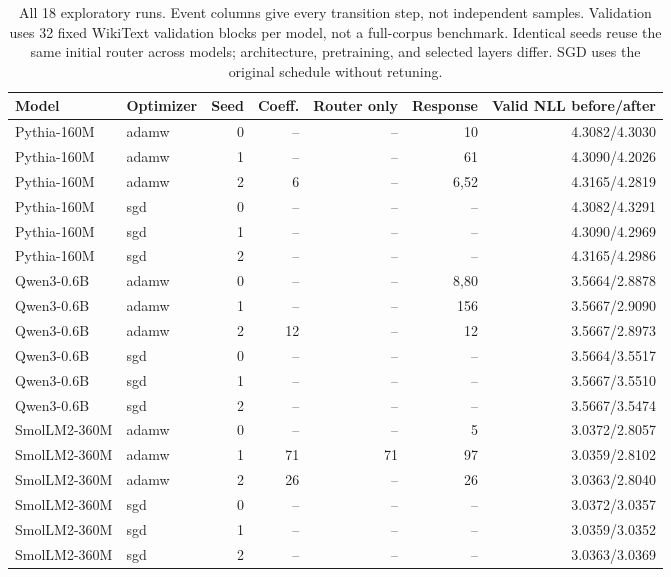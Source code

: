 \begin{table}[htbp]
\centering\small
\begin{tabular}{llrrrrr}
\toprule
Model & Optimizer & Seed & Coeff. & Router only & Response & Valid NLL before/after \\
\midrule
Pythia-160M & adamw & 0 & -- & -- & 10 & 4.3082/4.3030 \\
Pythia-160M & adamw & 1 & -- & -- & 61 & 4.3090/4.2026 \\
Pythia-160M & adamw & 2 & 6 & -- & 6,52 & 4.3165/4.2819 \\
Pythia-160M & sgd & 0 & -- & -- & -- & 4.3082/4.3291 \\
Pythia-160M & sgd & 1 & -- & -- & -- & 4.3090/4.2969 \\
Pythia-160M & sgd & 2 & -- & -- & -- & 4.3165/4.2986 \\
Qwen3-0.6B & adamw & 0 & -- & -- & 8,80 & 3.5664/2.8878 \\
Qwen3-0.6B & adamw & 1 & -- & -- & 156 & 3.5667/2.9090 \\
Qwen3-0.6B & adamw & 2 & 12 & -- & 12 & 3.5667/2.8973 \\
Qwen3-0.6B & sgd & 0 & -- & -- & -- & 3.5664/3.5517 \\
Qwen3-0.6B & sgd & 1 & -- & -- & -- & 3.5667/3.5510 \\
Qwen3-0.6B & sgd & 2 & -- & -- & -- & 3.5667/3.5474 \\
SmolLM2-360M & adamw & 0 & -- & -- & 5 & 3.0372/2.8057 \\
SmolLM2-360M & adamw & 1 & 71 & 71 & 97 & 3.0359/2.8102 \\
SmolLM2-360M & adamw & 2 & 26 & -- & 26 & 3.0363/2.8040 \\
SmolLM2-360M & sgd & 0 & -- & -- & -- & 3.0372/3.0357 \\
SmolLM2-360M & sgd & 1 & -- & -- & -- & 3.0359/3.0352 \\
SmolLM2-360M & sgd & 2 & -- & -- & -- & 3.0363/3.0369 \\
\bottomrule\end{tabular}
\caption{All 18 exploratory runs. Event columns give every transition step, not independent samples. Validation uses 32 fixed WikiText validation blocks per model, not a full-corpus benchmark. Identical seeds reuse the same initial router across models; architecture, pretraining, and selected layers differ. SGD uses the original schedule without retuning.}
\label{tab:all-dynamics-runs}
\end{table}
